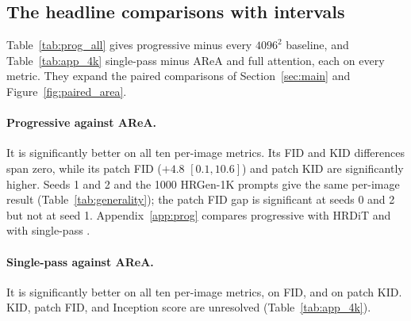
\ifshortversion\else
\fullonly{\FloatBarrier}
\subsection{The headline comparisons with intervals}
\label{app:pairs}

Table~\ref{tab:prog_all} gives progressive \sca{} minus every $4096^2$ baseline, and Table~\ref{tab:app_4k} single-pass \sca{} minus AReA and full attention, each on every metric. They expand the paired comparisons of Section~\ref{sec:main} and Figure~\ref{fig:paired_area}.

\paragraph{Progressive \sca{} against AReA.} It is significantly better on all ten per-image metrics. Its FID and KID differences span zero, while its patch FID ($+4.8$ $[0.1,10.6]$) and patch KID are significantly higher. Seeds 1 and 2 and the 1000 HRGen-1K prompts give the same per-image result (Table~\ref{tab:generality}); the patch FID gap is significant at seeds 0 and 2 but not at seed 1. Appendix~\ref{app:prog} compares progressive \sca{} with HRDiT and with single-pass \sca{}.

\paragraph{Single-pass \sca{} against AReA.} It is significantly better on all ten per-image metrics, on FID, and on patch KID. KID, patch FID, and Inception score are unresolved (Table~\ref{tab:app_4k}).


\begin{table}[!htbp]
  \caption{\textbf{Single-pass \sca{} beats AReA on all ten per-image metrics, FID, and patch KID at $4096^2$.} Expands the single-pass row of Table~\ref{tab:main}. FLUX.1-dev, \nmain{} prompts. $\Delta$: the method minus AReA, with its 95\% paired percentile-bootstrap interval in grey. Intervals use 1000 prompt draws for single-pass \sca{} (FID, KID, and their patch versions also resample reference-image clusters) and 2000 for full attention's per-image metrics; full attention's set-level differences and campaign time have none.  / : significantly better / worse than AReA; for FID, KID, and time lower is better. $^\ddagger$Campaign mean (clean latency: Table~\ref{tab:latency}). Table~\ref{tab:prog_all} pairs progressive \sca{} with every baseline. Key result: KID, patch FID, and Inception score are unresolved; every other metric favours single-pass \sca{}.\pendAppFourK}
  \label{tab:app_4k}
\end{table}
\apxdeciles

